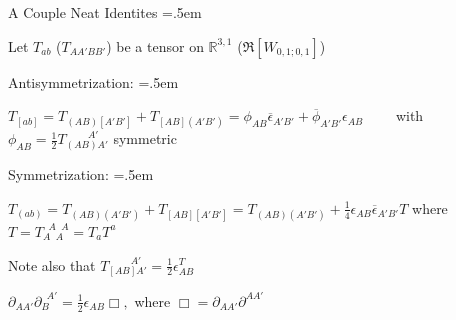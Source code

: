 \documentclass[xcolor={dvipsnames}]{beamer}
\let\olditemize=\itemize
\let\endolditemize=\enditemize
\renewenvironment{itemize}{\olditemize \itemsep=.5em }{\endolditemize}
\begin{document}
\begin{frame}{A Couple Neat Identites}
    \begin{itemize}
        \item<2-> Let $T_{ab}$ ($T_{AA'BB'}$) be a tensor on $\mathbb{R}^{3,1}$ ($\Re[W_{0,1;0,1}]$)
        \item<3-> Antisymmetrization:
        \begin{itemize}
            \item<4-> $T_{[ab]} = T_{(AB)[A'B']} + T_{[AB](A'B')} = \phi_{AB}\overline{\epsilon}_{A'B'} + \overline{\phi}_{A'B'}\epsilon_{AB}\qquad$ with $\phi_{AB} = \frac{1}{2}T_{(AB)A'}^{\qquad\; A'}$ symmetric
        \end{itemize}
        \item<5-> Symmetrization:
        \begin{itemize}
            \item<6-> $T_{(ab)} = T_{(AB)(A'B')} + T_{[AB][A'B']} = T_{(AB)(A'B')} + \frac{1}{4}\epsilon_{AB}\overline{\epsilon}_{A'B'}T$ where $T = T_{A\;\;A}^{\;\;A\;\;A} = T_aT^a$
            \item<7-> Note also that $T_{[AB]A'}^{\qquad\;A'} = \frac{1}{2}\epsilon_{AB}^T$ 
        \end{itemize}
        \item<8-> $\partial_{AA'}\partial_B^{\;\;A'} = \frac{1}{2}\epsilon_{AB}\Box, $ where $\Box = \partial_{AA'}\partial^{AA'} $
    \end{itemize}
\end{frame}
\end{document}
